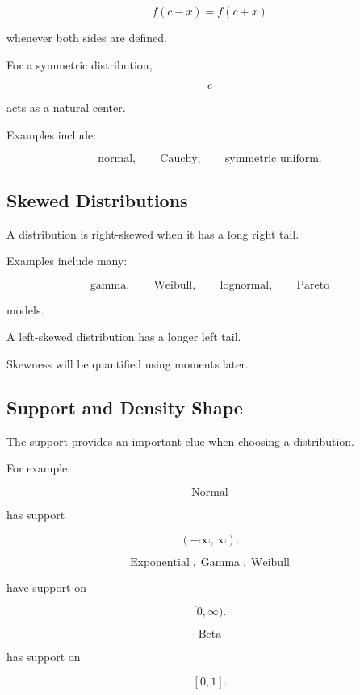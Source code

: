 \[
\boxed{
f(c-x)=f(c+x)
}
\]

whenever both sides are defined.

For a symmetric distribution,

\[
c
\]

acts as a natural center.

Examples include:

\[
\boxed{
\text{normal},
\qquad
\text{Cauchy},
\qquad
\text{symmetric uniform}.
}
\]

\subsection{Skewed Distributions}
\label{subsec:skewed-continuous-distributions}

A distribution is right-skewed when it has a long right tail.

Examples include many:

\[
\text{gamma},
\qquad
\text{Weibull},
\qquad
\text{lognormal},
\qquad
\text{Pareto}
\]

models.

A left-skewed distribution has a longer left tail.

Skewness will be quantified using moments later.

\subsection{Support and Density Shape}
\label{subsec:support-density-shape}

The support provides an important clue when choosing a distribution.

For example:

\[
\operatorname{Normal}
\]

has support

\[
(-\infty,\infty).
\]

\[
\operatorname{Exponential},
\operatorname{Gamma},
\operatorname{Weibull}
\]

have support on

\[
[0,\infty).
\]

\[
\operatorname{Beta}
\]

has support on

\[
[0,1].
\]


